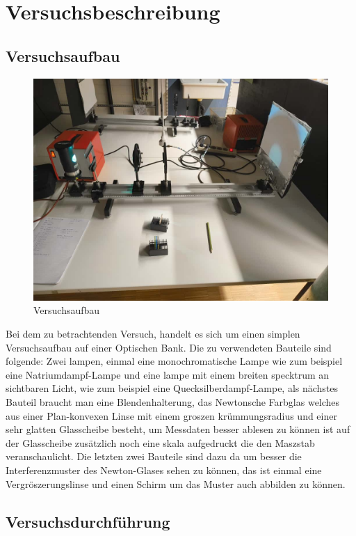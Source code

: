 \section{Versuchsbeschreibung}
\subsection{Versuchsaufbau}
\begin{figure} %
        \centering
        \includegraphics[width=0.9\linewidth]{Bilder/Versuchsaufbau O3.jpeg}
        \caption{Versuchsaufbau}
       \label{fig:SpASkizze}
\end{figure}
Bei dem zu betrachtenden Versuch, handelt es sich um einen simplen Versuchsaufbau auf einer 
Optischen Bank. Die zu verwendeten Bauteile sind folgende: Zwei lampen, einmal eine 
monochromatische Lampe wie zum beispiel eine Natriumdampf-Lampe und eine lampe mit einem 
breiten specktrum an sichtbaren Licht, wie zum beispiel eine Quecksilberdampf-Lampe, als 
nächstes Bauteil braucht man eine Blendenhalterung, das Newtonsche Farbglas welches aus 
einer Plan-konvexen Linse mit einem groszen krümmungsradius und einer sehr glatten 
Glasscheibe besteht, um Messdaten besser ablesen zu können ist auf der Glasscheibe zusätzlich 
noch eine skala aufgedruckt die den Maszstab veranschaulicht. Die letzten zwei Bauteile sind 
dazu da um besser die Interferenzmuster des Newton-Glases sehen zu können, das ist einmal 
eine Vergröszerungslinse und einen Schirm um das Muster auch abbilden zu können. %


\subsection{Versuchsdurchführung}

